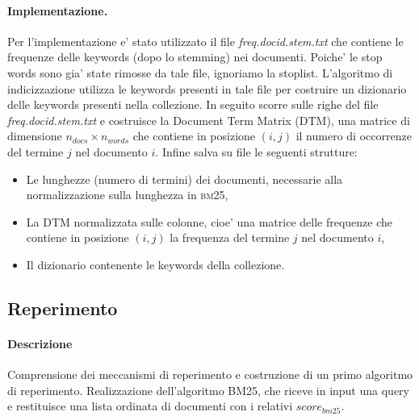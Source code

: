 \paragraph{\textbf{Implementazione.}}
Per l'implementazione e' stato utilizzato il file \textit{freq.docid.stem.txt} che contiene le frequenze delle keywords (dopo lo stemming) nei documenti. Poiche' le stop words sono gia' state rimosse da tale file, ignoriamo la stoplist.
L'algoritmo di indicizzazione utilizza le keywords presenti in tale file per costruire un dizionario delle keywords presenti nella collezione. In seguito scorre sulle righe del file \textit{freq.docid.stem.txt} e costruisce la Document Term Matrix (DTM), una matrice di  dimensione $n_{docs} \times n_{words}$ che contiene in posizione $(i,j)$ il numero di occorrenze del termine $j$ nel documento $i$. Infine salva su file le seguenti strutture:
\begin{itemize}
	\item Le lunghezze (numero di termini) dei documenti, necessarie alla normalizzazione sulla lunghezza in \textsc{bm25},
	\item La DTM normalizzata sulle colonne, cioe' una matrice delle frequenze che contiene in posizione $(i,j)$ la frequenza del termine $j$ nel documento $i$,
	\item Il dizionario contenente le keywords della collezione.
\end{itemize}

\subsection{Reperimento}
\label{sec:metodi-di-reper}

\paragraph{\textbf{Descrizione}}
Comprensione dei meccanismi di reperimento e costruzione di un primo algoritmo di reperimento.
Realizzazione dell'algoritmo \textsc{BM25}, che riceve in input una query e restituisce una lista ordinata di documenti con i relativi $score_{bm25}$.

